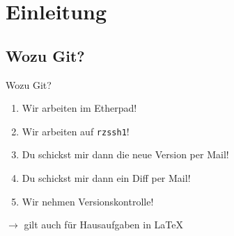 \section{Einleitung}
\subsection{Wozu Git?}

\begin{frame}{Wozu Git?}

    \begin{enumerate}
        \item<3-> Wir arbeiten im Etherpad!
        \item<4-> Wir arbeiten auf \texttt{rzssh1}!
        \item<5-> Du schickst mir dann die neue Version per Mail!
        \item<6-> Du schickst mir dann ein Diff per Mail!
        \item<7-> Wir nehmen Versionskontrolle!
    \end{enumerate}

     {
        $\rightarrow$ gilt auch für Hausaufgaben in \LaTeX
    }

\iffinal
    \vspace{0.2cm}


\end{frame}
